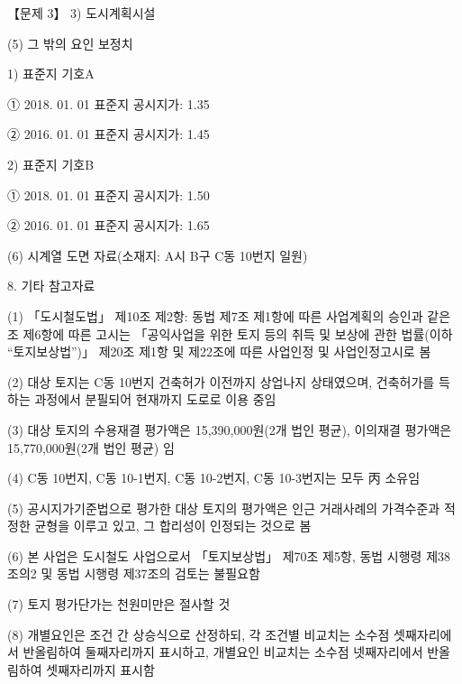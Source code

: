 \begin{longquestion}{【문제 3】}
3) 도시계획시설 \par
{\small\centering\renewcommand{\arraystretch}{1.25}
\par}

\medskip\noindent (5) 그 밖의 요인 보정치 \par
1) 표준지 기호A \par
① 2018. 01. 01 표준지 공시지가: 1.35 \par
② 2016. 01. 01 표준지 공시지가: 1.45 \par
2) 표준지 기호B \par
① 2018. 01. 01 표준지 공시지가: 1.50 \par
② 2016. 01. 01 표준지 공시지가: 1.65 \par
\medskip\noindent (6) 시계열 도면 자료(소재지: A시 B구 C동 10번지 일원) \par
{}
8. 기타 참고자료 \par
\medskip\noindent (1) 「도시철도법」 제10조 제2항: 동법 제7조 제1항에 따른 사업계획의 승인과 같은 조 제6항에 따른 고시는 「공익사업을 위한 토지 등의 취득 및 보상에 관한 법률(이하 “토지보상법”)」 제20조 제1항 및 제22조에 따른 사업인정 및 사업인정고시로 봄 \par
\medskip\noindent (2) 대상 토지는 C동 10번지 건축허가 이전까지 상업나지 상태였으며, 건축허가를 득하는 과정에서 분필되어 현재까지 도로로 이용 중임 \par
\medskip\noindent (3) 대상 토지의 수용재결 평가액은 15,390,000원(2개 법인 평균), 이의재결 평가액은 15,770,000원(2개 법인 평균) 임 \par
\medskip\noindent (4) C동 10번지, C동 10-1번지, C동 10-2번지, C동 10-3번지는 모두 丙 소유임 \par
\medskip\noindent (5) 공시지가기준법으로 평가한 대상 토지의 평가액은 인근 거래사례의 가격수준과 적정한 균형을 이루고 있고, 그 합리성이 인정되는 것으로 봄 \par
\medskip\noindent (6) 본 사업은 도시철도 사업으로서 「토지보상법」 제70조 제5항, 동법 시행령 제38조의2 및 동법 시행령 제37조의 검토는 불필요함 \par
\medskip\noindent (7) 토지 평가단가는 천원미만은 절사할 것 \par
\medskip\noindent (8) 개별요인은 조건 간 상승식으로 산정하되, 각 조건별 비교치는 소수점 셋째자리에서 반올림하여 둘째자리까지 표시하고, 개별요인 비교치는 소수점 넷째자리에서 반올림하여 셋째자리까지 표시함 \par
\end{longquestion}

